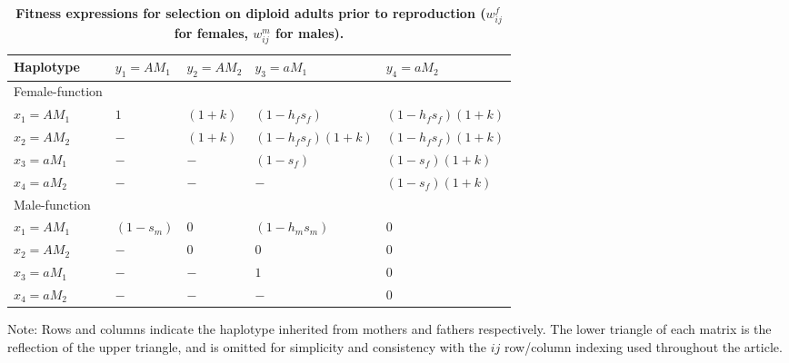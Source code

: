 \documentclass[9pt,twocolumn,twoside,lineno]{gsajnl}
\begin{document}
\begin{table*}[htbp]
\centering
\caption{\bf Fitness expressions for selection on diploid adults prior to reproduction ($w^f_{ij}$ for females, $w^m_{ij}$ for males).}
\begin{tableminipage}{\textwidth}
\begin{tabularx}{\textwidth}{XXXXX}
\hline
Haplotype & $y_1 = AM_1$ & $y_2 = AM_2$ & $y_3 = aM_1$ & $y_4 = aM_2$ \\
\hline
Female-function & & & & \\
$x_1 = AM_1$ & $1$ & $(1 + k)$ & $(1 - h_f s_f)$        & $(1 - h_f s_f)(1 + k)$ \\
$x_2 = AM_2$ & $-$ & $(1 + k)$ & $(1 - h_f s_f)(1 + k)$ & $(1 - h_f s_f)(1 + k)$ \\
$x_3 = aM_1$ & $-$ & $-$       & $(1 - s_f)$            & $(1 - s_f)(1 + k)$ \\
$x_4 = aM_2$ & $-$ & $-$       & $-$                    & $(1 - s_f)(1 + k)$ \\
Male-function & & & & \\
$x_1 = AM_1$ & $(1 - s_m)$ & $0$ & $(1 - h_m s_m)$ & $0$ \\
$x_2 = AM_2$ & $-$         & $0$ & $0$             & $0$ \\
$x_3 = aM_1$ & $-$         & $-$ & $1$             & $0$ \\
$x_4 = aM_2$ & $-$         & $-$ & $-$             & $0$ \\
\hline
\end{tabularx}
  \label{tab:fitness}
\end{tableminipage}
{\footnotesize Note: Rows and columns indicate the haplotype inherited from mothers and fathers respectively. The lower triangle of each matrix is the reflection of the upper triangle, and is omitted for simplicity and consistency with the $ij$ row/column indexing used throughout the article.}
\end{table*}
\end{document}

